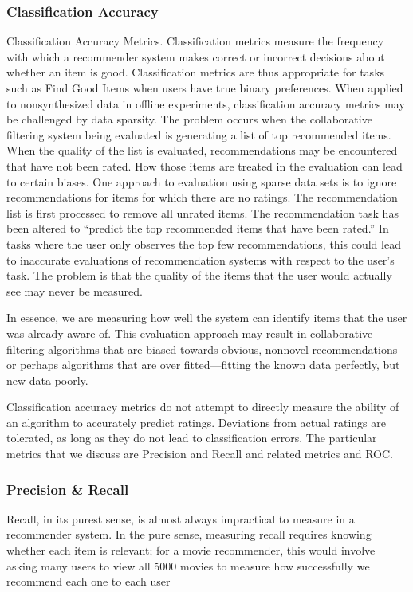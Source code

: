 \subsubsection{Classification Accuracy}
Classification Accuracy Metrics. Classification metrics measure the
frequency with which a recommender system makes correct or incorrect decisions
about whether an item is good. Classification metrics are thus appropriate
for tasks such as Find Good Items when users have true binary preferences.
When applied to nonsynthesized data in offline experiments, classification
accuracy metrics may be challenged by data sparsity. The problem occurs when
the collaborative filtering system being evaluated is generating a list of top
recommended items. When the quality of the list is evaluated, recommendations
may be encountered that have not been rated. How those items are treated in
the evaluation can lead to certain biases.
One approach to evaluation using sparse data sets is to ignore recommendations
for items for which there are no ratings. The recommendation list is first
processed to remove all unrated items. The recommendation task has been altered
to “predict the top recommended items that have been rated.” In tasks
where the user only observes the top few recommendations, this could lead to
inaccurate evaluations of recommendation systems with respect to the user’s task. The problem is that the quality of the items that the user would actually
see may never be measured.

In essence, we are measuring how well the system
can identify items that the user was already aware of. This evaluation approach
may result in collaborative filtering algorithms that are biased towards obvious,
nonnovel recommendations or perhaps algorithms that are over fitted—fitting
the known data perfectly, but new data poorly.

Classification accuracy metrics do not attempt to directly measure the ability
of an algorithm to accurately predict ratings. Deviations from actual ratings
are tolerated, as long as they do not lead to classification errors. The particular
metrics that we discuss are Precision and Recall and related metrics and ROC.


\subsubsection{Precision \& Recall}

Recall, in its purest sense, is almost always impractical to measure in a
recommender system. In the pure sense, measuring recall requires knowing
whether each item is relevant; for a movie recommender, this would involve
asking many users to view all 5000 movies to measure how successfully we recommend
each one to each user

